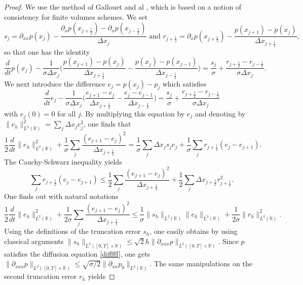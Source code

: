 \documentclass[a4paper,french,english,10pt]{article}
\begin{document}
\begin{proof}
We  use the method of Gallouet and al \cite{FV}, which
is based on  a notion of consistency for finite volumes schemes.
We set
$$
s_j=\partial_{xx}p(x_j)-\frac{\partial_xp(x_{j+\frac12}  )
-
\partial_xp(x_{j-\frac12}  )
}{\Delta x_j}
\mbox{ and }
r_{j+\frac12}=\partial_{x}p(x_{j+\frac12})-\frac{p(x_{j+1}  )
-
p(x_{j}  )
}{\Delta x_{j+\frac12}},
$$
so that one has the identity
$$
 \frac{d}{dt} p(x_j)
-\frac{1}{\sigma\Delta x_j}\bigg(\frac{p(x_{j+1})-p(x_{j})}{\Delta
x_{j+\frac12 }}-\frac{p(x_{j})-p(x_{j-1})}{\Delta
x_{j-\frac12 }}\bigg)=
\frac{s_j}\sigma+
\frac{r_{j+\frac12}-r_{j-\frac12}}{\sigma \Delta x_j}.
$$
We next  introduce the difference
$e_j=p(x_j)-p_j$ which satisfies
$$
 \frac{d}{dt} e_j
-\frac{1}{\sigma\Delta x_j}\bigg(\frac{e_{j+1}-e_{j}}{\Delta
x_{j+\frac12 }}-\frac{e_{j}-e_{j-1}}{\Delta
x_{j-\frac12 }}\bigg)=
\frac{s_j}\sigma+
\frac{r_{j+\frac12}-r_{j-\frac12}}{\sigma \Delta x_j}
$$
with $e_j(0)=0$ for all $j$.
By multiplying this equation by $e_j$
and  denoting by $\|e_h\|_{L^2(\mathbb{R})}^2= \sum_j \Delta x_je_j^2$,
one finds that 
\begin{equation*}\label{fgfg}
\frac12 \frac{d}{dt}\|e_h\|_{L^2(\mathbb{R})}^2 +\frac{1}{\sigma} \sum_j
\frac{(e_{j+1}-e_{j})^2}{\Delta
x_{j+\frac12 }}=
\frac{1}{\sigma}\sum_j \Delta x_j s_j e_j+\frac{1}{\sigma}\sum_jr_{j+\frac12 }(e_j-e_{j+1}).
\end{equation*}
The Cauchy-Schwarz inequality yields 
\begin{equation*}
\sum_jr_{j+\frac12 }(e_j-e_{j+1})\leq \frac{1}{2} \sum_j
\frac{(e_{j+1}-e_{j})^2}{\Delta x_{j+\frac12 }}+\frac{1}{2}\sum_j\Delta
x_{j+\frac12 }r_{j+\frac12 }^2.
\end{equation*}
One finds out with natural notations
\begin{equation} \label{eq:eee}
\frac12 \frac{d}{dt} \|e_h\|_{L^2(\mathbb{R})}^2+
\frac{1}{2 \sigma} \sum_j
\frac{(e_{j+1}-e_{j})^2}{\Delta x_{j+\frac12 }}\leq
\frac{1}{\sigma}\| s_h\|_{L^2(\mathbb{R})} \|e_h\|_{L^2(\mathbb{R})}+
\frac{1}{2\sigma} \|r_h\|^2_{L^2(\mathbb{R})}.
\end{equation}
Using the  definitions of  the truncation error $s_h$, one easily obtains by using classical arguments $\|s_h\|_{L^2([0,T]\times\mathbb{R})}\leq \sqrt{2}h\|\partial_{xxx}p\|_{L^2([0,T]\times\mathbb{R})}$. Since $p$ satisfies the diffusion equation \eqref{difffff}, one gets $\|\partial_{xxx}p\|_{L^2([0,T]\times\mathbb{R})} \leq \sqrt{\sigma/2} \|\partial_{xx}p_0\|_{L^2(\mathbb{R})}$. The same manipulations on the second truncation error $r_h$ yields

\end{proof}
\end{document}
